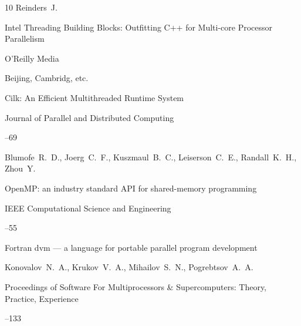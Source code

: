 \begin{thebibliography}{10}
\by Reinders~J.

\book Intel Threading Building Blocks: Outfitting C++ for  Multi-core Processor Parallelism

\publ O'Reilly Media

\publaddr Beijing, Cambridg, etc.












\paper Cilk: An Efficient Multithreaded Runtime System


\jour Journal of Parallel and Distributed Computing 



--69

\by Blumofe~R.~D., Joerg~C.~F., Kuszmaul~B.~C., Leiserson~C.~E., Randall~K.~H., Zhou~Y. 






\paper OpenMP: an industry standard API for shared-memory programming


\jour IEEE Computational Science and Engineering 



--55








\paper Fortran dvm --- a language for portable parallel program development

\by Konovalov~N.~A., Krukov~V.~A., Mihailov~S.~N., Pogrebtsov~A.~A.

\inbook Proceedings of Software For Multiprocessors \& Supercomputers:   Theory, Practice, Experience


--133






\end{thebibliography}
